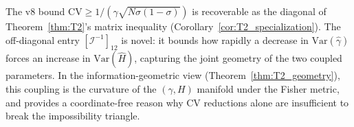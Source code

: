 \begin{remark}
The v8 bound $\mathrm{CV} \ge 1/(\gamma \sqrt{N \sigma(1-\sigma)})$ is
recoverable as the diagonal of Theorem~\ref{thm:T2}'s matrix inequality
(Corollary~\ref{cor:T2_specialization}). The off-diagonal entry
$[\mathcal{I}^{-1}]_{12}$ is novel: it bounds how rapidly a decrease in
$\mathrm{Var}(\hat\gamma)$ forces an increase in $\mathrm{Var}(\hat H)$,
capturing the joint geometry of the two coupled parameters. In the
information-geometric view (Theorem~\ref{thm:T2_geometry}), this coupling is
the curvature of the $(\gamma, H)$ manifold under the Fisher metric, and
provides a coordinate-free reason why CV reductions alone are insufficient
to break the impossibility triangle.
\end{remark}


%
%
%
